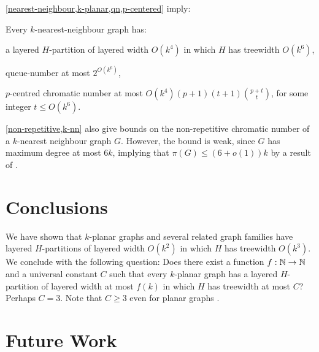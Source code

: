 \documentclass{patmorin}
\renewcommand{\geq}{\geqslant}
\renewcommand{\leq}{\leqslant}
\begin{document}
\cref{nearest-neighbour,k-planar,qn,p-centered} imply:

\begin{cor}
\label{k-nn}
Every $k$-nearest-neighbour graph has:
\begin{compactitem}
\item a layered $H$-partition of layered width $O(k^4)$ in which $H$ has treewidth $O(k^6)$,
\item queue-number at most $2^{O(k^6)}$,
\item $p$-centred chromatic number at most $O(k^4) (p+1) (t+1)\binom{p+t}{t}$, for some integer $t\leq O(k^6)$.
\end{compactitem}
\end{cor}

\cref{non-repetitive,k-nn} also give bounds on the non-repetitive chromatic number of a $k$-nearest neighbour graph $G$. However, the bound is weak, since $G$ has maximum degree at most $6k$, implying that $\pi(G) \leq (6+o(1))k$ by a result of \citet{DJKW16}.


\section{Conclusions}

We have shown that $k$-planar graphs and several related graph families have layered $H$-partitions of layered width $O(k^2)$ in which $H$ has treewidth $O(k^3)$.  We conclude with the following question:  Does there exist a function $f:\mathbb{N}\to\mathbb{N}$ and a universal constant $C$ such that every $k$-planar graph has a layered $H$-partition of layered width at most $f(k)$ in which $H$ has treewidth at most $C$?  Perhaps $C=3$. Note that $C\geq 3$ even for planar graphs \citep{dujmovic.joret.ea:planar}.  



\newpage
\appendix

\section{Future Work}
\end{document}
